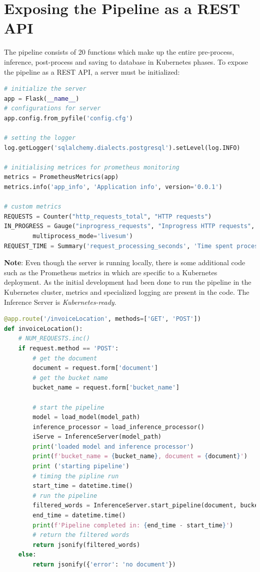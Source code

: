 \section{Exposing the Pipeline as a REST API}
The pipeline consists of 20 functions which make up the entire pre-process, inference, post-process and saving to database in Kubernetes phases.
To expose the pipeline as a REST API, a server must be initialized:
\begin{lstlisting}[language=python, caption={Initializing the Server.}, label=server_init]
# initialize the server
app = Flask(__name__)
# configurations for server
app.config.from_pyfile('config.cfg')

# setting the logger
log.getLogger('sqlalchemy.dialects.postgresql').setLevel(log.INFO)

# initialising metrices for prometheus monitoring
metrics = PrometheusMetrics(app)
metrics.info('app_info', 'Application info', version='0.0.1')

# custom metrics
REQUESTS = Counter("http_requests_total", "HTTP requests")
IN_PROGRESS = Gauge("inprogress_requests", "Inprogress HTTP requests",
        multiprocess_mode='livesum')
REQUEST_TIME = Summary('request_processing_seconds', 'Time spent processing request')
\end{lstlisting}
\textbf{Note}: Even though the server is running locally, there is some additional code such as the Prometheus metrics in 
which are specific to a Kubernetes deployment. As the initial development had been done to run the pipeline in the Kubernetes
cluster, metrics and specialized logging are present in the code. The Inference Server is \emph{Kubernetes-ready}.
\begin{lstlisting}[language=python, caption={Inference Endpoint Defined.}, label=infer_endpoint]
@app.route('/invoiceLocation', methods=['GET', 'POST'])
def invoiceLocation():
	# NUM_REQUESTS.inc()
	if request.method == 'POST':
		# get the document
		document = request.form['document']
		# get the bucket name
		bucket_name = request.form['bucket_name']

		# start the pipeline
		model = load_model(model_path)
		inference_processor = load_inference_processor()
		iServe = InferenceServer(model_path)
		print('loaded model and inference processor')
		print(f'bucket_name = {bucket_name}, document = {document}')
		print ('starting pipeline')
		# timing the pipline run
		start_time = datetime.time()
		# run the pipeline
		filtered_words = InferenceServer.start_pipeline(document, bucket_name, model, inference_processor)
		end_time = datetime.time()
		print(f'Pipeline completed in: {end_time - start_time}')
		# return the filtered words
		return jsonify(filtered_words)
	else:
		return jsonify({'error': 'no document'})
	
\end{lstlisting}

